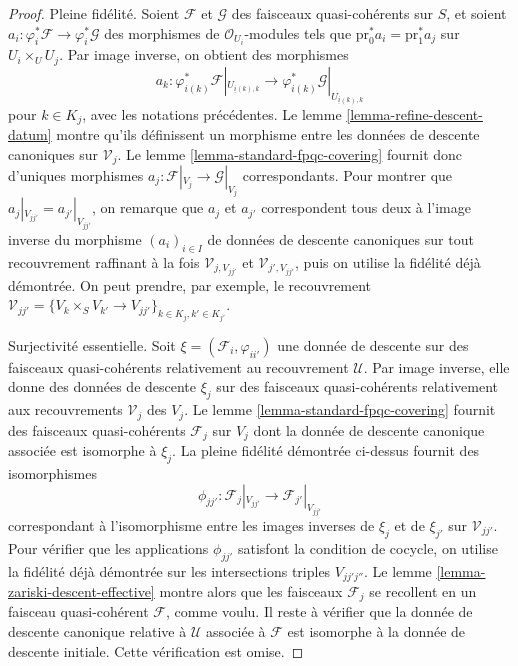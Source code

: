 \begin{proof}
\medskip\noindent
Pleine fidélité. Soient $\mathcal{F}$ et $\mathcal{G}$ des faisceaux
quasi-cohérents sur $S$, et soient
$a_i : \varphi_i^*\mathcal{F} \to \varphi_i^*\mathcal{G}$
des morphismes de $\mathcal{O}_{U_i}$-modules tels que
$\text{pr}_0^*a_i = \text{pr}_1^*a_j$ sur $U_i \times_U U_j$.
Par image inverse, on obtient des morphismes
$$
a_k :
\varphi_{i(k)}^*\mathcal{F}|_{U_{\underline{i}(k), k}}
\longrightarrow
\varphi_{i(k)}^*\mathcal{G}|_{U_{\underline{i}(k), k}}
$$
pour $k \in K_j$, avec les notations précédentes.
Le lemme \ref{lemma-refine-descent-datum} montre qu'ils définissent
un morphisme entre les données de descente canoniques sur $\mathcal{V}_j$.
Le lemme \ref{lemma-standard-fpqc-covering} fournit donc
d'uniques morphismes $a_j : \mathcal{F}|_{V_j} \to \mathcal{G}|_{V_j}$
correspondants. Pour montrer que $a_j|_{V_{jj'}} = a_{j'}|_{V_{jj'}}$,
on remarque que $a_j$ et $a_{j'}$ correspondent tous deux à l'image inverse
du morphisme $(a_i)_{i \in I}$ de données de descente canoniques sur
tout recouvrement raffinant à la fois $\mathcal{V}_{j, V_{jj'}}$
et $\mathcal{V}_{j', V_{jj'}}$, puis on utilise la fidélité déjà démontrée.
On peut prendre, par exemple, le recouvrement
$\mathcal{V}_{jj'} =
\{V_k \times_S V_{k'} \to V_{jj'}\}_{k \in K_j, k' \in K_{j'}}$.

\medskip\noindent
Surjectivité essentielle. Soit $\xi = (\mathcal{F}_i, \varphi_{ii'})$
une donnée de descente sur des faisceaux quasi-cohérents relativement
au recouvrement $\mathcal{U}$.
Par image inverse, elle donne des données de descente $\xi_j$
sur des faisceaux quasi-cohérents relativement aux recouvrements
$\mathcal{V}_j$ des $V_j$.
Le lemme \ref{lemma-standard-fpqc-covering} fournit des faisceaux
quasi-cohérents $\mathcal{F}_j$ sur $V_j$ dont la donnée de descente
canonique associée est isomorphe à $\xi_j$.
La pleine fidélité démontrée ci-dessus fournit des isomorphismes
$$
\phi_{jj'} :
\mathcal{F}_j|_{V_{jj'}}
\longrightarrow
\mathcal{F}_{j'}|_{V_{jj'}}
$$
correspondant à l'isomorphisme entre les images inverses
de $\xi_j$ et de $\xi_{j'}$ sur $\mathcal{V}_{jj'}$.
Pour vérifier que les applications $\phi_{jj'}$ satisfont
la condition de cocycle, on utilise la fidélité déjà démontrée
sur les intersections triples $V_{jj'j''}$.
Le lemme \ref{lemma-zariski-descent-effective} montre alors
que les faisceaux $\mathcal{F}_j$ se recollent en un faisceau
quasi-cohérent $\mathcal{F}$, comme voulu.
Il reste à vérifier que la donnée de descente canonique relative à
$\mathcal{U}$ associée à $\mathcal{F}$ est isomorphe à la donnée de descente
initiale. Cette vérification est omise.
\end{proof}









